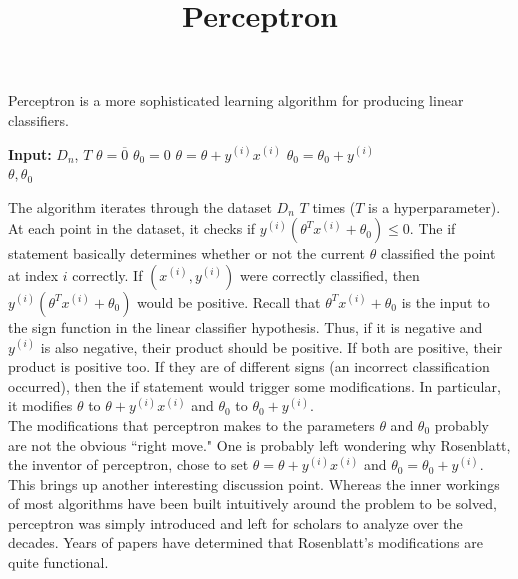 \documentclass{article}
\title{Perceptron}
\author{ }
\date{ }
\begin{document}
	
	\maketitle 

    Perceptron is a more sophisticated learning algorithm for producing linear classifiers. 
    
    \begin{algorithm}
    \begin{algorithmic}[]
        \State \textbf{Input:} $D_n$, $T$
        \State $\theta = \overline{0}$
        \State $\theta_0 = 0$
                    \State $\theta = \theta + y^{(i)}x^{(i)}$
                    \State $\theta_0 = \theta_0+y^{(i)}$
                \EndIf
            \EndFor    
        \EndFor \\
        \Return $\theta, \theta_0$
    \end{algorithmic}
    \end{algorithm}

    The algorithm iterates through the dataset $D_n$ $T$ times ($T$ is a hyperparameter). At each point in the dataset, it checks if $y^{(i)}(\theta^Tx^{(i)}+\theta_0)\leq0$. The if statement basically determines whether or not the current $\theta$ classified the point at index $i$ correctly. If $(x^{(i)}, y^{(i)})$ were correctly classified, then $y^{(i)}(\theta^Tx^{(i)}+\theta_0)$ would be positive. Recall that $\theta^Tx^{(i)}+\theta_0$ is the input to the sign function in the linear classifier hypothesis. Thus, if it is negative and $y^{(i)}$ is also negative, their product should be positive. If both are positive, their product is positive too. If they are of different signs (an incorrect classification occurred), then the if statement would trigger some modifications. In particular, it modifies $\theta$ to $\theta+y^{(i)}x^{(i)}$ and $\theta_0$ to $\theta_0+y^{(i)}$. \\

    The modifications that perceptron makes to the parameters $\theta$ and $\theta_0$ probably are not the obvious ``right move." One is probably left wondering why Rosenblatt, the inventor of perceptron, chose to set $\theta=\theta+y^{(i)}x^{(i)}$ and $\theta_0=\theta_0+y^{(i)}$. This brings up another interesting discussion point. Whereas the inner workings of most algorithms have been built intuitively around the problem to be solved, perceptron was simply introduced and left for scholars to analyze over the decades. Years of papers have determined that Rosenblatt's modifications are quite functional. \\
\end{document}
